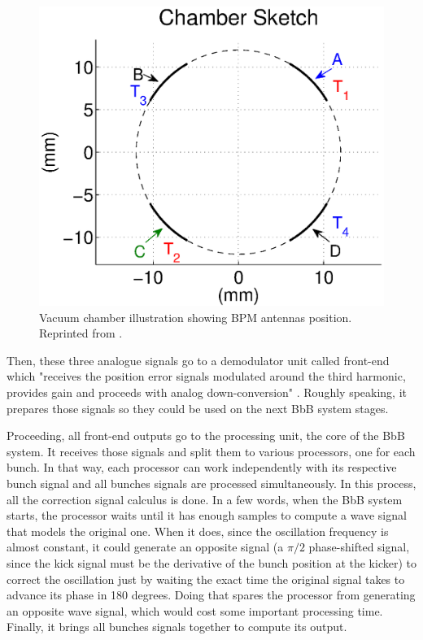 \begin{figure}[!htb]
	\centering
	\includegraphics[width=0.7\linewidth]{./Figures/BPMsketch.eps}
	\caption{Vacuum chamber illustration showing BPM antennas position. Reprinted from \cite{digBPMCalculation}.}
	\label{fig:BPMsketch}
\end{figure}

Then, these three analogue signals go to a demodulator unit called front-end which "receives the position error signals modulated around the third harmonic, provides gain and proceeds with analog down-conversion" \cite{digBPMCalculation}. Roughly speaking, it prepares those signals so they could be used on the next BbB system stages.

Proceeding, all front-end outputs go to the processing unit, the core of the BbB system. It receives those signals and split them to various processors, one for each bunch. In that way, each processor can work independently with its respective bunch signal and all bunches signals are processed simultaneously. In this process, all the correction signal calculus is done. In a few words, when the BbB system starts, the processor waits until it has enough samples to compute a wave signal that models the original one. When it does, since the oscillation frequency is almost constant, it could generate an opposite signal (a $\pi/2$ phase-shifted signal, since the kick signal must be the derivative of the bunch position at the kicker) to correct the oscillation just by waiting the exact time the original signal takes to advance its phase in 180 degrees. Doing that spares the processor from generating an opposite wave signal, which would cost some important processing time. Finally, it brings all bunches signals together to compute its output.

